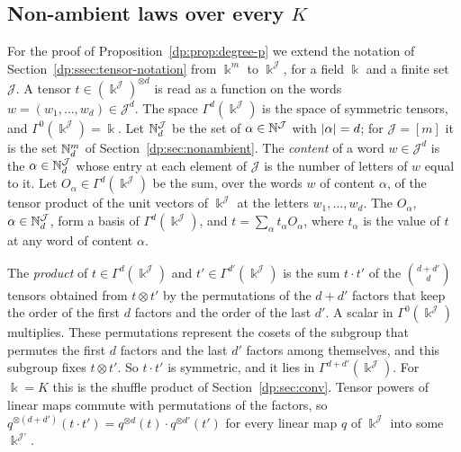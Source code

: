 \subsection{Non-ambient laws over every \texorpdfstring{$K$}{K}}\label{dp:ssec:degree-p}

For the proof of Proposition~\ref{dp:prop:degree-p} we extend the notation of Section~\ref{dp:ssec:tensor-notation} from $\Bbbk^m$ to $\Bbbk^{\mathcal J}$, for a field $\Bbbk$ and a finite set $\mathcal J$. A tensor $t\in(\Bbbk^{\mathcal J})^{\otimes d}$ is read as a function on the words $w=(w_1,\dots,w_d)\in\mathcal J^d$. The space $\Gamma^d(\Bbbk^{\mathcal J})$ is the space of symmetric tensors, and $\Gamma^0(\Bbbk^{\mathcal J})=\Bbbk$. Let $\mathbb N^{\mathcal J}_d$ be the set of $\alpha\in\mathbb N^{\mathcal J}$ with $\lvert \alpha\rvert=d$; for $\mathcal J=[m]$ it is the set $\mathbb N^m_d$ of Section~\ref{dp:sec:nonambient}. The \emph{content} of a word $w\in\mathcal J^d$ is the $\alpha\in\mathbb N^{\mathcal J}_d$ whose entry at each element of $\mathcal J$ is the number of letters of $w$ equal to it. Let $O_\alpha\in\Gamma^d(\Bbbk^{\mathcal J})$ be the sum, over the words $w$ of content $\alpha$, of the tensor product of the unit vectors of $\Bbbk^{\mathcal J}$ at the letters $w_1,\dots,w_d$. The $O_\alpha$, $\alpha\in\mathbb N^{\mathcal J}_d$, form a basis of $\Gamma^d(\Bbbk^{\mathcal J})$, and $t=\sum_\alpha t_\alpha O_\alpha$, where $t_\alpha$ is the value of $t$ at any word of content $\alpha$.

The \emph{product} of $t\in\Gamma^d(\Bbbk^{\mathcal J})$ and $t'\in\Gamma^{d'}(\Bbbk^{\mathcal J})$ is the sum $t\cdot t'$ of the $\binom{d+d'}d$ tensors obtained from $t\otimes t'$ by the permutations of the $d+d'$ factors that keep the order of the first $d$ factors and the order of the last $d'$. A scalar in $\Gamma^0(\Bbbk^{\mathcal J})$ multiplies. These permutations represent the cosets of the subgroup that permutes the first $d$ factors and the last $d'$ factors among themselves, and this subgroup fixes $t\otimes t'$. So $t\cdot t'$ is symmetric, and it lies in $\Gamma^{d+d'}(\Bbbk^{\mathcal J})$. For $\Bbbk=K$ this is the shuffle product of Section~\ref{dp:sec:conv}. Tensor powers of linear maps commute with permutations of the factors, so $q^{\otimes(d+d')}(t\cdot t')=q^{\otimes d}(t)\cdot q^{\otimes d'}(t')$ for every linear map $q$ of $\Bbbk^{\mathcal J}$ into some $\Bbbk^{\mathcal J'}$.

